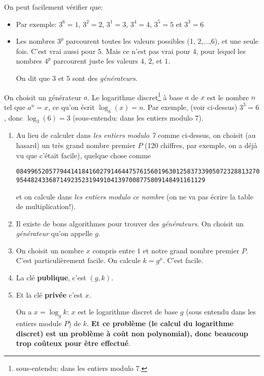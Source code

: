 On peut facilement vérifier que:
\begin{itemize}
 \item Par exemple:
   $3^6 = 1$, $3^2=2$, $3^1 = 3$, $3^4= 4$, $3^5=5$ et $3^3= 6$
 \item Les nombres $3^p$ parcourent toutes les valeurs
   possibles (1, 2,...,6), et une seule fois. C'est vrai aussi pour
   $5$.
   Mais ce n'est pas vrai pour $4$, pour lequel les nombres $4^p$
   parcourent juste les valeurs $4$, $2$, et $1$.

   On dit que $3$ et $5$ sont des \emph{générateurs}. 
\end{itemize}



On choisit un générateur $a$. Le logarithme
discret\footnote{sous-entendu: dans les entiers modulo 7.}  à base $a$
de $x$ est 
le nombre $n$ tel que $a^n = x$, ce qu'on écrit $\log_a (x) = n$. Par
exemple, (voir ci-dessus) $3^3= 6$, donc $\log_3(6)= 3$ (sous-entendu:
dans les entiers modulo 7).

\begin{enumerate}
  \item Au lieu de calculer dans \emph{les entiers modulo 7} comme ci-dessus,
    on choisit (au hasard)  un très grand nombre premier $P$ (120
    chiffres, par exemple, 
    on a déjà vu que c'était facile),
    quelque chose comme
\begin{verbatim}
08499652057794414184160279146447576156019630125837339050723288132709
9544824336871492352319491041397008775809148491161129
\end{verbatim}
et on calcule dans  \emph{les entiers modulo ce nombre} (on ne va pas
écrire la table de multiplication!).
 \item Il existe de bons algorithmes pour trouver des
   \emph{générateurs}. On choisit un \emph{générateur} qu'on appelle $g$.
 \item On choisit un nombre $x$ compris entre $1$ et notre grand
   nombre premier $P$. C'est particulièrement facile. On calcule $k=
   g^x$. C'est facile.
 \item La clé \textbf{publique}, c'est $(g,k)$.
 \item Et la clé \textbf{privée} c'est $x$.

   On a $x = \log_g k$: $x$
   est le logarithme discret de base $g$ (sous entendu dans les
   entiers module $P$) de $k$. \textbf{Et ce problème (le calcul du
     logarithme discret) est un problème à coût non polynomial), donc
     beaucoup trop coûteux pour être effectué}.
\end{enumerate}

